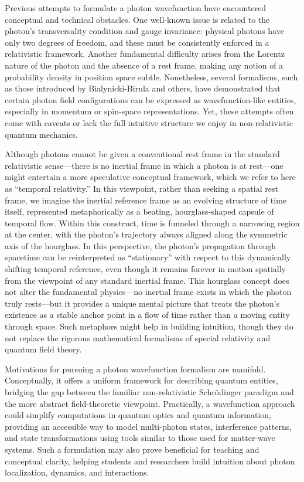 \documentclass[aps,prl,twocolumn,showpacs,showkeys,superscriptaddress,amsmath,amssymb]{revtex4-2}
\begin{document}
Previous attempts to formulate a photon wavefunction have encountered conceptual and technical obstacles. One well-known issue is related to the photon’s transversality condition and gauge invariance: physical photons have only two degrees of freedom, and these must be consistently enforced in a relativistic framework. Another fundamental difficulty arises from the Lorentz nature of the photon and the absence of a rest frame, making any notion of a probability density in position space subtle. Nonetheless, several formalisms, such as those introduced by Bialynicki-Birula and others, have demonstrated that certain photon field configurations can be expressed as wavefunction-like entities, especially in momentum or spin-space representations. Yet, these attempts often come with caveats or lack the full intuitive structure we enjoy in non-relativistic quantum mechanics.

Although photons cannot be given a conventional rest frame in the standard relativistic sense—there is no inertial frame in which a photon is at rest—one might entertain a more speculative conceptual framework, which we refer to here as “temporal relativity.” In this viewpoint, rather than seeking a spatial rest frame, we imagine the inertial reference frame as an evolving structure of time itself, represented metaphorically as a beating, hourglass-shaped capsule of temporal flow. Within this construct, time is funneled through a narrowing region at the center, with the photon’s trajectory always aligned along the symmetric axis of the hourglass. In this perspective, the photon’s propagation through spacetime can be reinterpreted as “stationary” with respect to this dynamically shifting temporal reference, even though it remains forever in motion spatially from the viewpoint of any standard inertial frame. This hourglass concept does not alter the fundamental physics—no inertial frame exists in which the photon truly rests—but it provides a unique mental picture that treats the photon's existence as a stable anchor point in a flow of time rather than a moving entity through space. Such metaphors might help in building intuition, though they do not replace the rigorous mathematical formalisms of special relativity and quantum field theory.

Motivations for pursuing a photon wavefunction formalism are manifold. Conceptually, it offers a uniform framework for describing quantum entities, bridging the gap between the familiar non-relativistic Schr\"odinger paradigm and the more abstract field-theoretic viewpoint. Practically, a wavefunction approach could simplify computations in quantum optics and quantum information, providing an accessible way to model multi-photon states, interference patterns, and state transformations using tools similar to those used for matter-wave systems. Such a formulation may also prove beneficial for teaching and conceptual clarity, helping students and researchers build intuition about photon localization, dynamics, and interactions.
\end{document}
